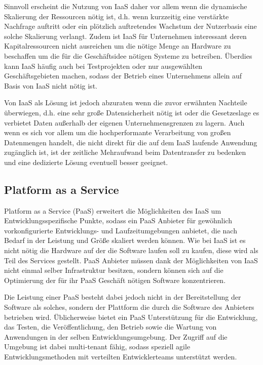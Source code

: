 Sinnvoll erscheint die Nutzung von IaaS daher vor allem wenn die dynamische Skalierung der Ressourcen nötig ist, d.h. wenn kurzzeitig eine verstärkte Nachfrage auftritt oder ein plötzlich auftretendes Wachstum der Nutzerbasis eine solche Skalierung verlangt. Zudem ist IaaS für Unternehmen interessant deren Kapitalressourcen nicht ausreichen um die nötige Menge an Hardware zu beschaffen um die für die Geschäftsidee nötigen Systeme zu betreiben. Überdies kann IaaS häufig auch bei Testprojekten oder nur ausgewählten Geschäftsgebieten machen, sodass der Betrieb eines Unternehmens allein auf Basis von IaaS nicht nötig ist.

Von IaaS als Lösung ist jedoch abzuraten wenn die zuvor erwähnten Nachteile überwiegen, d.h. eine sehr große Datensicherheit nötig ist oder die Gesetzeslage es verbietet Daten außerhalb der eigenen Unternehmensgrenzen zu lagern. Auch wenn es sich vor allem um die hochperformante Verarbeitung von großen Datenmengen handelt, die nicht direkt für die auf dem IaaS laufende Anwendung zugänglich ist, ist der zeitliche Mehraufwand beim Datentransfer zu bedenken und eine dedizierte Lösung eventuell besser geeignet. \cite{technet} \cite{rackSpace} \cite{ibm2011}

\subsection{Platform as a Service}
Platform as a Service (PaaS) erweitert die Möglichkeiten des IaaS um Entwicklungsspezifische Punkte, sodass ein PaaS Anbieter für gewöhnlich vorkonfigurierte Entwicklungs- und Laufzeitumgebungen anbietet, die nach Bedarf in der Leistung und Größe skaliert werden können. Wie bei IaaS ist es nicht nötig die Hardware auf der die Software laufen soll zu kaufen, diese wird als Teil des Services gestellt. PaaS Anbieter müssen dank der Möglichkeiten von IaaS nicht einmal selber Infrastruktur besitzen, sondern können sich auf die Optimierung der für ihr PaaS Geschäft nötigen Software konzentrieren. 

Die Leistung einer PaaS besteht dabei jedoch nicht in der Bereitstellung der Software als solches, sondern der Plattform die durch die Software des Anbieters betrieben wird. Üblicherweise bietet ein PaaS Unterstützung für die Entwicklung, das Testen, die Veröffentlichung, den Betrieb sowie die Wartung von Anwendungen in der selben Entwicklungsumgebung. Der Zugriff auf die Umgebung ist dabei multi-tenant fähig, sodass speziell agile Entwicklungsmethoden mit verteilten Entwicklerteams unterstützt werden. 

